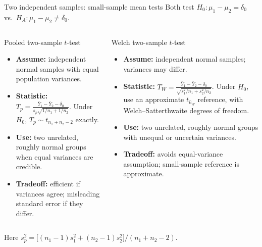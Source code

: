 \documentclass[aspectratio=169,11pt]{beamer}
\begin{document}
\begin{frame}{Two independent samples: small-sample mean tests}
  \footnotesize
  Both test \(H_0:\mu_1-\mu_2=\delta_0\) vs.\ \(H_A:\mu_1-\mu_2\ne\delta_0\).
  \begin{columns}[T,onlytextwidth]
      \begin{block}{Pooled two-sample \(t\)-test}
        \begin{itemize}
          \item \textbf{Assume:} independent normal samples with equal population variances.
          \item \textbf{Statistic:} \(\displaystyle T_p=\frac{\bar Y_1-\bar Y_2-\delta_0}{s_p\sqrt{1/n_1+1/n_2}}\). Under \(H_0\), \(T_p\sim t_{n_1+n_2-2}\) exactly.
          \item \textbf{Use:} two unrelated, roughly normal groups when equal variances are credible.
          \item \textbf{Tradeoff:} efficient if variances agree; misleading standard error if they differ.
        \end{itemize}
      \end{block}
      \begin{block}{Welch two-sample \(t\)-test}
        \begin{itemize}
          \item \textbf{Assume:} independent normal samples; variances may differ.
          \item \textbf{Statistic:} \(\displaystyle T_W=\frac{\bar Y_1-\bar Y_2-\delta_0}{\sqrt{s_1^2/n_1+s_2^2/n_2}}\). Under \(H_0\), use an approximate \(t_{\widehat\nu_W}\) reference, with Welch--Satterthwaite degrees of freedom.
          \item \textbf{Use:} two unrelated, roughly normal groups with unequal or uncertain variances.
          \item \textbf{Tradeoff:} avoids equal-variance assumption; small-sample reference is approximate.
        \end{itemize}
      \end{block}
  \end{columns}
  \vspace{1mm}
  \scriptsize Here \(s_p^2=\bigl[(n_1-1)s_1^2+(n_2-1)s_2^2\bigr]/(n_1+n_2-2)\).
\end{frame}
\end{document}

